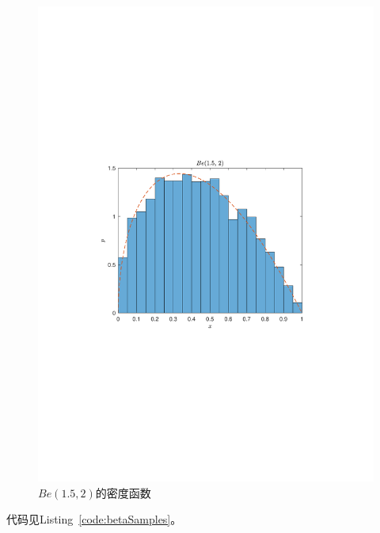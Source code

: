 \begin{figure}[htbp]
\begin{minipage}[t]{0.5\textwidth}
        \includegraphics[width = \textwidth]{image/betapdf.pdf}
        \caption{$Be(1.5, 2)$的密度函数}
        \label{fig:betapdf}
    \end{minipage}
\end{figure}

代码见Listing~\ref{code:betaSamples}。
